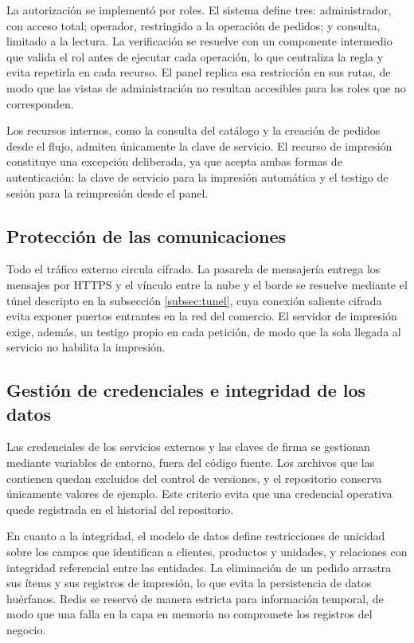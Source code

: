 La autorización se implementó por roles. El sistema define tres: administrador, con acceso total; operador, restringido a la operación de pedidos; y consulta, limitado a la lectura. La verificación se resuelve con un componente intermedio que valida el rol antes de ejecutar cada operación, lo que centraliza la regla y evita repetirla en cada recurso. El panel replica esa restricción en sus rutas, de modo que las vistas de administración no resultan accesibles para los roles que no corresponden.

Los recursos internos, como la consulta del catálogo y la creación de pedidos desde el flujo, admiten únicamente la clave de servicio. El recurso de impresión constituye una excepción deliberada, ya que acepta ambas formas de autenticación: la clave de servicio para la impresión automática y el testigo de sesión para la reimpresión desde el panel.

\subsection{Protección de las comunicaciones}
\label{subsec:proteccion_comunicaciones}

Todo el tráfico externo circula cifrado. La pasarela de mensajería entrega los mensajes por HTTPS y el vínculo entre la nube y el borde se resuelve mediante el túnel descripto en la subsección \ref{subsec:tunel}, cuya conexión saliente cifrada evita exponer puertos entrantes en la red del comercio. El servidor de impresión exige, además, un testigo propio en cada petición, de modo que la sola llegada al servicio no habilita la impresión.

\subsection{Gestión de credenciales e integridad de los datos}
\label{subsec:credenciales}

Las credenciales de los servicios externos y las claves de firma se gestionan mediante variables de entorno, fuera del código fuente. Los archivos que las contienen quedan excluidos del control de versiones, y el repositorio conserva únicamente valores de ejemplo. Este criterio evita que una credencial operativa quede registrada en el historial del repositorio.

En cuanto a la integridad, el modelo de datos define restricciones de unicidad sobre los campos que identifican a clientes, productos y unidades, y relaciones con integridad referencial entre las entidades. La eliminación de un pedido arrastra sus ítems y sus registros de impresión, lo que evita la persistencia de datos huérfanos. Redis se reservó de manera estricta para información temporal, de modo que una falla en la capa en memoria no compromete los registros del negocio.